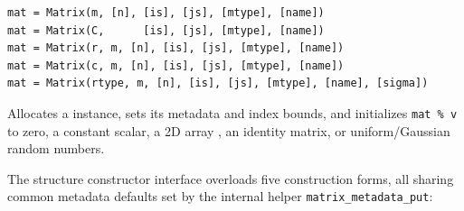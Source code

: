 \lstset{language=[95]Fortran}
\begin{lstlisting}
mat = Matrix(m, [n], [is], [js], [mtype], [name])
mat = Matrix(C,      [is], [js], [mtype], [name])
mat = Matrix(r, m, [n], [is], [js], [mtype], [name])
mat = Matrix(c, m, [n], [is], [js], [mtype], [name])
mat = Matrix(rtype, m, [n], [is], [js], [mtype], [name], [sigma])
\end{lstlisting}

Allocates a  instance, sets its metadata and index bounds, and initializes \texttt{mat \% v} to zero, a constant scalar, a 2D array , an identity matrix, or uniform/Gaussian random numbers.

The structure constructor interface  overloads five construction forms, all sharing common metadata defaults set by the internal helper \texttt{matrix\_metadata\_put}:
